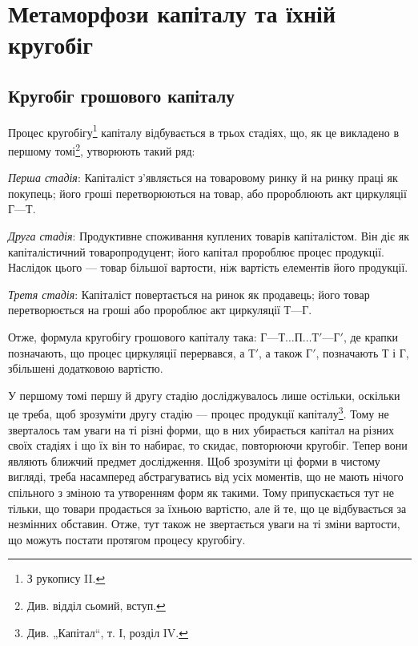 \parcont{}  %

\chapter{Метаморфози капіталу та їхній кругобіг}

\section{Кругобіг грошового капіталу}

\label{original-3}
Процес кругобігу\footnote{
З рукопису II.
} капіталу відбувається в трьох стадіях, що, як
це викладено в першому томі\footnote*{
Див. відділ сьомий, вступ. 
}, утворюють такий ряд:

\emph{Перша стадія}: Капіталіст з’являється на товаровому ринку й на
ринку праці як покупець; його гроші перетворюються на товар, або пророблюють
акт циркуляції $Г — Т$.

\emph{Друга стадія}: Продуктивне споживання куплених товарів капіталістом.
Він діє як капіталістичний товаропродуцент; його капітал пророблює
процес продукції. Наслідок цього — товар більшої вартости, ніж
вартість елементів його продукції.

\emph{Третя стадія}: Капіталіст повертається на ринок як продавець; його
товар перетворюється на гроші або пророблює акт циркуляції $Т — Г$.

Отже, формула кругобігу грошового капіталу така: $Г — Т\dots{} П\dots{} Т' —
Г'$, де крапки позначають, що процес циркуляції перервався, а $Т'$, а
також $Г'$, позначають $Т$ і $Г$, збільшені додатковою вартістю.

У першому томі першу й другу стадію досліджувалось лише остільки,
оскільки це треба, щоб зрозуміти другу стадію — процес продукції капіталу\footnote*{
Див. „Капітал“, т. І, розділ IV. 
}.
Тому не зверталось там уваги на ті різні форми, що в них убирається
капітал на різних своїх стадіях і що їх він то набирає, то скидає,
повторюючи кругобіг. Тепер вони являють ближчий предмет дослідження.
Щоб зрозуміти ці форми в чистому вигляді, треба насамперед абстрагуватись
від усіх моментів, що не мають нічого спільного з зміною та
утворенням форм як такими. Тому припускається тут не тільки, що товари
продається за їхньою вартістю, але й те, що це відбувається за
незмінних обставин. Отже, тут також не звертається уваги на ті зміни
вартости, що можуть постати протягом процесу кругобігу.
